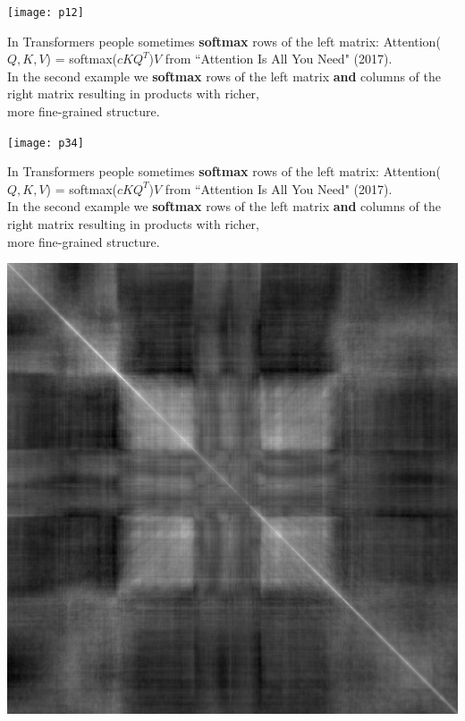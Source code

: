 \documentclass{beamer}
\newcommand{\msmagenta}[1]{{\color{mymagenta} #1}}
\begin{document}
\begin{frame}

\texttt{[image: p12]}

In Transformers people sometimes {\bf softmax} rows of the left matrix:
{\scriptsize Attention($Q, K, V$) = softmax($cKQ^T$)$V$ from ``Attention Is All You Need" (2017).}\\[1ex]

In the second example we {\bf softmax} rows of the left matrix {\bf and} \msmagenta{columns of the right matrix} resulting in products
with richer,\\ more fine-grained structure.

\end{frame}

\begin{frame}

\texttt{[image: p34]}

In Transformers people sometimes {\bf softmax} rows of the left matrix:
{\scriptsize Attention($Q, K, V$) = softmax($cKQ^T$)$V$ from ``Attention Is All You Need" (2017).}\\[1ex]

In the second example we {\bf softmax} rows of the left matrix {\bf and} \msmagenta{columns of the right matrix} resulting in products
with richer,\\ more fine-grained structure.

\end{frame}

\begin{frame}

\includegraphics[scale=0.5]{symmetric}

\end{frame}
\end{document}
